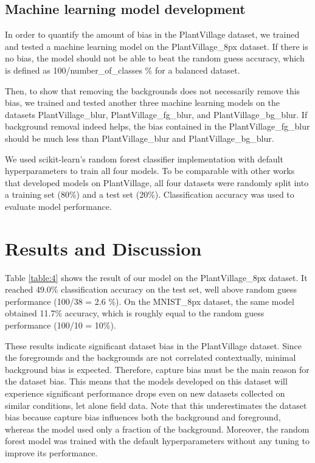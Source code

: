 \documentclass{article}
\begin{document}
\subsection{Machine learning model development}

In order to quantify the amount of bias in the PlantVillage dataset, we trained and tested a machine learning model on the PlantVillage\_8px dataset. If there is no bias, the model should not be able to beat the random guess accuracy, which is defined as 100/number\_of\_classes \% for a balanced dataset.

Then, to show that removing the backgrounds does not necessarily remove this bias, we trained and tested another three machine learning models on the datasets PlantVillage\_blur, PlantVillage\_fg\_blur, and PlantVillage\_bg\_blur. If background removal indeed helps, the bias contained in the PlantVillage\_fg\_blur should be much less than PlantVillage\_blur and PlantVillage\_bg\_blur.

We used scikit-learn's random forest classifier implementation with default hyperparameters to train all four models\cite{Pedregosa2011}. To be comparable with other works that developed models on PlantVillage, all four datasets were randomly split into a training set (80\%) and a test set (20\%). Classification accuracy was used to evaluate model performance.

\section{Results and Discussion}

Table \ref{table:4} shows the result of our model on the PlantVillage\_8px dataset. It reached 49.0\% classification accuracy on the test set, well above random guess performance (100/38 = 2.6 \%). On the MNIST\_8px dataset, the same model obtained 11.7\% accuracy, which is roughly equal to the random guess performance (100/10 = 10\%).

These results indicate significant dataset bias in the PlantVillage dataset. Since the foregrounds and the backgrounds are not correlated contextually, minimal background bias is expected. Therefore, capture bias must be the main reason for the dataset bias. This means that the models developed on this dataset will experience significant performance drops even on new datasets collected on similar conditions, let alone field data. Note that this underestimates the dataset bias because capture bias influences both the background and foreground, whereas the model used only a fraction of the background. Moreover, the random forest model was trained with the default hyperparameters without any tuning to improve its performance.
\end{document}
